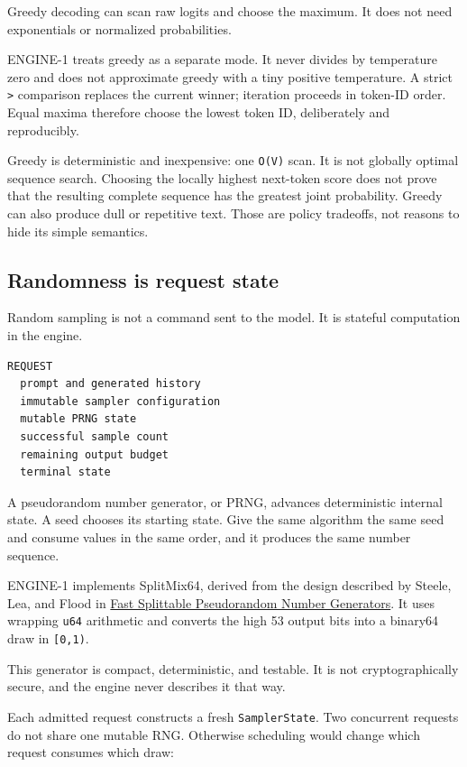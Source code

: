 \documentclass[
  10pt,
]{article}
\begin{document}
Greedy decoding can scan raw logits and choose the maximum. It does not
need exponentials or normalized probabilities.

ENGINE-1 treats greedy as a separate
\texttt{} mode. It never divides by
temperature zero and does not approximate greedy with a tiny positive
temperature. A strict \texttt{\textgreater{}} comparison replaces the
current winner; iteration proceeds in token-ID order. Equal maxima
therefore choose the lowest token ID, deliberately and reproducibly.

Greedy is deterministic and inexpensive: one \texttt{O(V)} scan. It is
not globally optimal sequence search. Choosing the locally highest
next-token score does not prove that the resulting complete sequence has
the greatest joint probability. Greedy can also produce dull or
repetitive text. Those are policy tradeoffs, not reasons to hide its
simple semantics.

\subsection{Randomness is request
state}\label{randomness-is-request-state}

Random sampling is not a command sent to the model. It is stateful
computation in the engine.

\begin{verbatim}
REQUEST
  prompt and generated history
  immutable sampler configuration
  mutable PRNG state
  successful sample count
  remaining output budget
  terminal state
\end{verbatim}

A pseudorandom number generator, or PRNG, advances deterministic
internal state. A seed chooses its starting state. Give the same
algorithm the same seed and consume values in the same order, and it
produces the same number sequence.

ENGINE-1 implements SplitMix64, derived from the design described by
Steele, Lea, and Flood in
\href{https://doi.org/10.1145/2660193.2660195}{Fast Splittable
Pseudorandom Number Generators}. It uses wrapping \texttt{u64}
arithmetic and converts the high 53 output bits into a binary64 draw in
\texttt{{[}0,1)}.

This generator is compact, deterministic, and testable. It is not
cryptographically secure, and the engine never describes it that way.

Each admitted request constructs a fresh \texttt{SamplerState}. Two
concurrent requests do not share one mutable RNG. Otherwise scheduling
would change which request consumes which draw:
\end{document}
